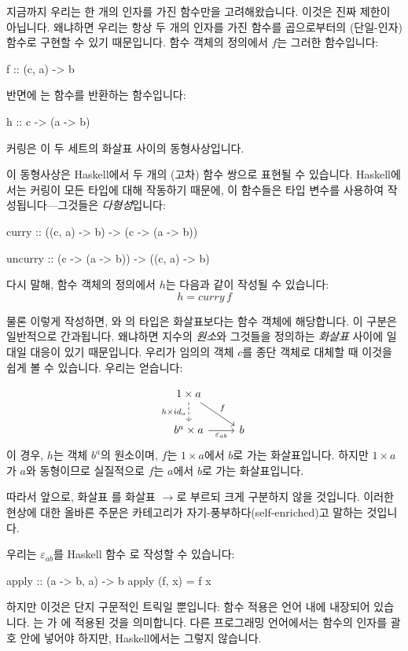 \documentclass[DaoFP]{subfiles}
\begin{document}
지금까지 우리는 한 개의 인자를 가진 함수만을 고려해왔습니다. 이것은 진짜 제한이 아닙니다. 왜냐하면 우리는 항상 두 개의 인자를 가진 함수를 곱으로부터의 (단일-인자) 함수로 구현할 수 있기 때문입니다. 함수 객체의 정의에서 $f$는 그러한 함수입니다:
\begin{haskell}
f :: (c, a) -> b
\end{haskell}
반면에 는 함수를 반환하는 함수입니다:
\begin{haskell}
h :: c -> (a -> b)
\end{haskell}
커링은 이 두 세트의 화살표 사이의 동형사상입니다.

이 동형사상은 Haskell에서 두 개의 (고차) 함수 쌍으로 표현될 수 있습니다. Haskell에서는 커링이 모든 타입에 대해 작동하기 때문에, 이 함수들은 타입 변수를 사용하여 작성됩니다—그것들은 \emph{다형성}입니다:
\begin{haskell}
curry   :: ((c, a) -> b)   -> (c -> (a -> b))
\end{haskell}

\begin{haskell}
uncurry :: (c -> (a -> b)) -> ((c, a) -> b)
\end{haskell}
다시 말해, 함수 객체의 정의에서 $h$는 다음과 같이 작성될 수 있습니다:
\[ h = curry\, f \]

물론 이렇게 작성하면, 와 의 타입은 화살표보다는 함수 객체에 해당합니다. 이 구분은 일반적으로 간과됩니다. 왜냐하면 지수의 \emph{원소}와 그것들을 정의하는 \emph{화살표} 사이에 일대일 대응이 있기 때문입니다. 우리가 임의의 객체 $c$를 종단 객체로 대체할 때 이것을 쉽게 볼 수 있습니다. 우리는 얻습니다:

\[
 \begin{tikzcd}
 1 \times a
 \arrow[d, dashed, "h \times id_a"']
 \arrow[rd, "f"]
 \\
 b^a \times a
 \arrow[r, "\varepsilon_{a b}"']
& b
 \end{tikzcd}
\]
이 경우, $h$는 객체 $b^a$의 원소이며, $f$는 $1 \times a$에서 $b$로 가는 화살표입니다. 하지만 $1 \times a$가 $a$와 동형이므로 실질적으로 $f$는 $a$에서 $b$로 가는 화살표입니다.

따라서 앞으로, 화살표 \hask{->}를 화살표 $\to$로 부르되 크게 구분하지 않을 것입니다. 이러한 현상에 대한 올바른 주문은 카테고리가 자기-풍부하다(self-enriched)고 말하는 것입니다.

우리는 $\varepsilon_{a b}$를 Haskell 함수 로 작성할 수 있습니다:
\begin{haskell}
apply :: (a -> b, a) -> b
apply (f, x) = f x
\end{haskell}
하지만 이것은 단지 구문적인 트릭일 뿐입니다: 함수 적용은 언어 내에 내장되어 있습니다. 는 가 에 적용된 것을 의미합니다. 다른 프로그래밍 언어에서는 함수의 인자를 괄호 안에 넣어야 하지만, Haskell에서는 그렇지 않습니다.
\end{document}
